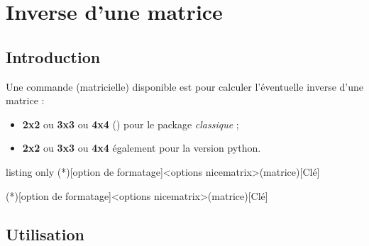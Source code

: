 \documentclass[french,a4paper,11pt]{article}
\newcommand\cmaj[1]{\tcbox[vignetteMaJ]{#1}\xspace}
\begin{document}
\section{Inverse d'une matrice}

\subsection{Introduction}

\begin{cautionblock}
Une commande (matricielle) disponible est pour calculer l'éventuelle inverse d'une matrice :

\begin{itemize}
	\item \textbf{2x2} ou \textbf{3x3} ou \textbf{4x4} (\cmaj{0.1.5}) pour le package \textit{classique} ;
	\item \textbf{2x2} ou \textbf{3x3} ou \textbf{4x4} également pour la version \textsf{python}.
\end{itemize}
\vspace*{-\baselineskip}\leavevmode
\end{cautionblock}

\begin{PresentationCode}{listing only}
\MatriceInverse(*)[option de formatage]<options nicematrix>(matrice)[Clé]

\MatriceInversePY(*)[option de formatage]<options nicematrix>(matrice)[Clé]
\end{PresentationCode}

\subsection{Utilisation}
\end{document}
